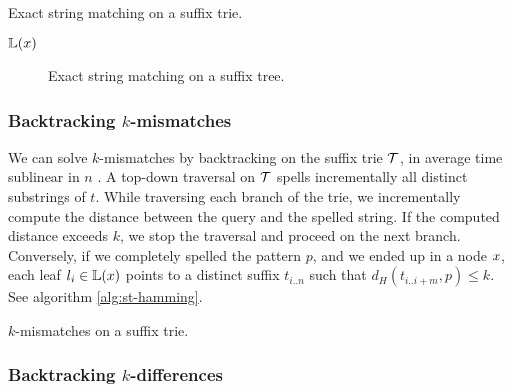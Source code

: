 \begin{algorithm}[h]
\caption{Exact string matching on a suffix trie.}
\label{alg:st-exact}
\begin{algorithmic}[1]
		\State \Report $\mathbb {L}(x)$
		\State {}
	\EndIf
\EndProcedure
\end{algorithmic}
\end{algorithm}

\begin{figure}[h]
\caption{Exact string matching on a suffix tree.}
\label{fig:st-exact}
\end{figure}

\subsubsection{Backtracking $k$-mismatches}

We can solve $k$-mismatches by backtracking \citep{Ukkonen1993, Baeza1999} on the suffix trie $\mathcal {T}$, in average time sublinear in $n$ \citep{Navarro2000}.
A top-down traversal on $\mathcal {T}$ spells incrementally all distinct substrings of $t$.
While traversing each branch of the trie, we incrementally compute the distance between the query and the spelled string.
If the computed distance exceeds $k$, we stop the traversal and proceed on the next branch.
Conversely, if we completely spelled the pattern $p$, and we ended up in a node $x$, each leaf $l_i \in \mathbb {L}(x)$ points to a distinct suffix $t_{i..n}$ such that $d_H(t_{i..i+m}, p) \leq k$.
See algorithm \ref{alg:st-hamming}.

\begin{algorithm}[h]
\caption{$k$-mismatches on a suffix trie.}
\label{alg:st-hamming}
\begin{algorithmic}[1]
		\State {}
	\Else 
		\ForAll {$\Cn \in \Ci(\Tn)$}
				\State {}
			\Else
				\State {}
			\EndIf
		\EndFor
	\EndIf
\EndProcedure
\end{algorithmic}
\end{algorithm}

\subsubsection{Backtracking $k$-differences}

